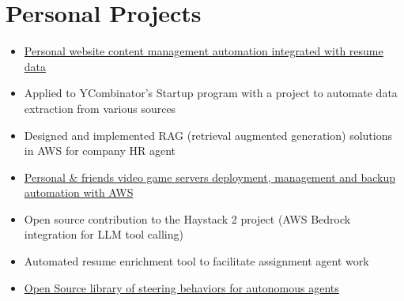 ﻿\documentclass[11pt,letterpaper]{article}
\begin{document}
\section*{Personal Projects}
\begin{itemize}
\item \href{https://github.com/FloRul/portfolio}{Personal website content management automation integrated with resume data}
\item Applied to YCombinator's Startup program with a project to automate data extraction from various sources
\item Designed and implemented RAG (retrieval augmented generation) solutions in AWS for company HR agent
\item \href{https://github.com/FloRul/Satiserver}{Personal \& friends video game servers deployment, management and backup automation with AWS}
\item Open source contribution to the Haystack 2 project (AWS Bedrock integration for LLM tool calling)
\item Automated resume enrichment tool to facilitate assignment agent work
\item \href{https://github.com/FloRul/RitFlocking}{Open Source library of steering behaviors for autonomous agents}
\end{itemize}
\end{document}
